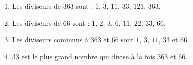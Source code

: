     \begin{enumerate}
        \item Les diviseurs de $363$ sont : $1$, $3$, $11$, $33$, $121$, $363$.
        \item Les diviseurs de 66 sont : $1$, $2$, $3$, $6$, $11$, $22$, $33$, $66$.
        \item Les diviseurs communs à $363$ et $66$ sont $1$, $3$, $11$, $33$ et $66$.
        \item $33$ est le plus grand nombre qui divise à la fois $363$ et $66$.
    \end{enumerate}
